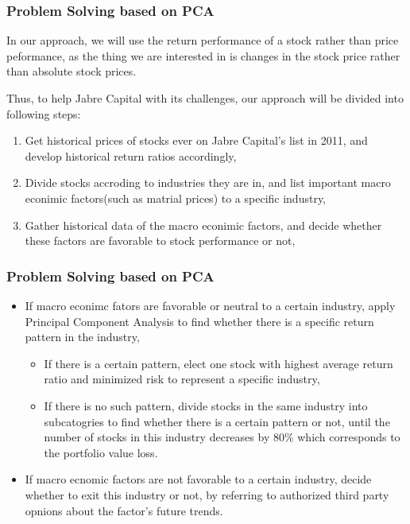 \documentclass[compress,handout,10pt]{beamer}
\let\olditem\item
\renewcommand{\item}{\setlength{\itemsep}{0.5\baselineskip}\olditem}
\begin{document}
\begin{frame}
    \frametitle{Problem Solving based on PCA}
In our approach, we will use the return performance of a stock rather than price peformance, as the thing we are interested in is changes in the stock price rather than absolute stock prices.

Thus, to help Jabre Capital with its challenges, our approach will be divided into following steps:
\begin{enumerate}
\item Get historical prices of stocks ever on Jabre Capital's list in 2011, and develop historical return ratios accordingly,
\item Divide stocks accroding to industries they are in, and list important macro econimic factors(such as matrial prices) to a specific industry,
\item Gather historical data of the macro econimic factors, and decide whether these factors are favorable to stock performance or not,
\end{enumerate}
\end{frame}

\begin{frame}
    \frametitle{Problem Solving based on PCA}
\begin{itemize}
\item If macro econimc fators are favorable or neutral to a certain industry, apply Principal Component Analysis to find whether there is a specific return pattern in the industry,
	\begin{itemize}
	\item If there is a certain pattern, elect one stock with highest average return ratio and minimized risk to represent a specific industry,
	\item If there is no such pattern, divide stocks in the same industry into subcatogries to find whether there is a certain pattern or not, until the number of stocks in this industry decreases by 80\% which corresponds to the portfolio value loss.
	\end{itemize}
\item If macro ecnomic factors are not favorable to a certain industry, decide whether to exit this industry or not, by referring to authorized third party opnions about the factor's future trends.
\end{itemize} 

\end{frame}
\end{document}
